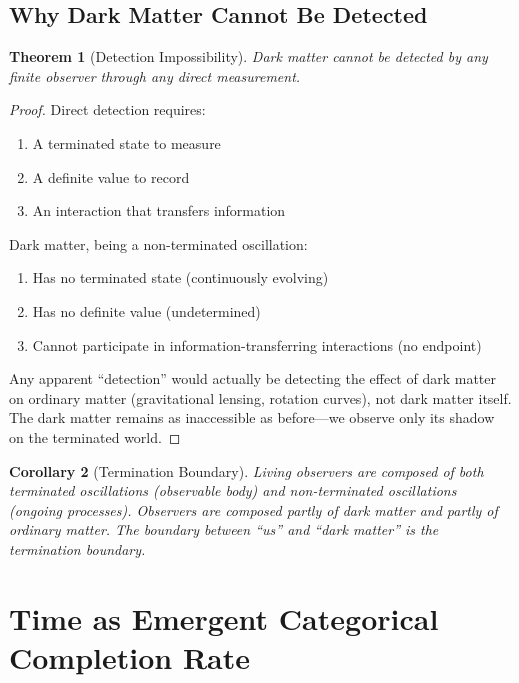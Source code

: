 \documentclass[12pt,a4paper]{article}
\newtheorem{theorem}{Theorem}[section]
\newtheorem{corollary}[theorem]{Corollary}
\theoremstyle{definition}
\theoremstyle{remark}
\begin{document}
\subsection{Why Dark Matter Cannot Be Detected}

\begin{theorem}[Detection Impossibility]
\label{thm:detection_impossibility_full}
Dark matter cannot be detected by any finite observer through any direct measurement.
\end{theorem}

\begin{proof}
Direct detection requires:
\begin{enumerate}
    \item A terminated state to measure
    \item A definite value to record
    \item An interaction that transfers information
\end{enumerate}

Dark matter, being a non-terminated oscillation:
\begin{enumerate}
    \item Has no terminated state (continuously evolving)
    \item Has no definite value (undetermined)
    \item Cannot participate in information-transferring interactions (no endpoint)
\end{enumerate}

Any apparent ``detection'' would actually be detecting the effect of dark matter on ordinary matter (gravitational lensing, rotation curves), not dark matter itself. The dark matter remains as inaccessible as before—we observe only its shadow on the terminated world.
\end{proof}

\begin{corollary}[Termination Boundary]
Living observers are composed of both terminated oscillations (observable body) and non-terminated oscillations (ongoing processes). Observers are composed partly of dark matter and partly of ordinary matter. The boundary between ``us'' and ``dark matter'' is the termination boundary.
\end{corollary}





\section{Time as Emergent Categorical Completion Rate}
\label{sec:emergent_time}
\end{document}

